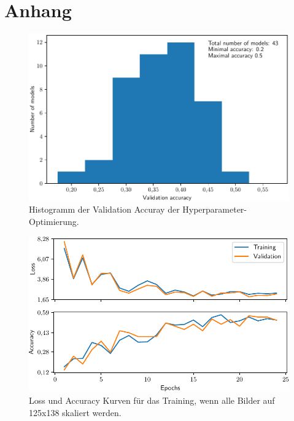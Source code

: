\section{Anhang}
\begin{figure}
  \centering
  \includegraphics[width=\textwidth]{pics/ergebnisse/acc_hist.pdf}
  \caption{Histogramm der Validation Accuray der Hyperparameter-Optimierung.}
  \label{fig:acc-hist}
\end{figure}

\begin{figure}
  \centering
  \includegraphics[width=\textwidth]{pics/ergebnisse/history_epoch_kleine_groesse.pdf}
  \caption{Loss und Accuracy Kurven für das Training, wenn alle Bilder
  auf 125x138 skaliert werden.}
  \label{fig:loss-acc-kleine-groesse}
\end{figure}



